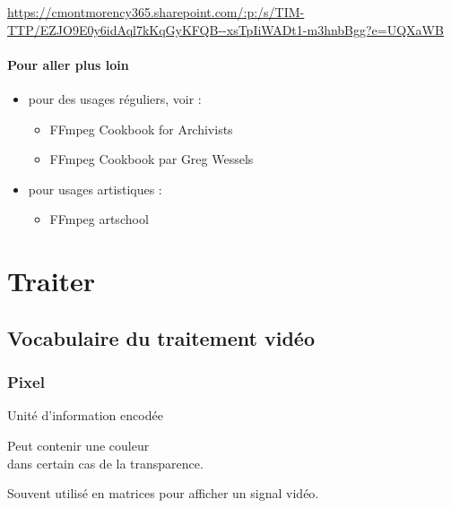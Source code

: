 \documentclass[
  french,
]{book}
\providecommand{\tightlist}{%
  \setlength{\itemsep}{0pt}\setlength{\parskip}{0pt}}
\begin{document}
\url{https://cmontmorency365.sharepoint.com/:p:/s/TIM-TTP/EZJO9E0y6idAql7kKqGyKFQB--xsTpIiWADt1-m3hnbBgg?e=UQXaWB}

\hypertarget{pour-aller-plus-loin}{%
\subsubsection{Pour aller plus loin}\label{pour-aller-plus-loin}}

\begin{itemize}
\item
  pour des usages réguliers, voir :

  \begin{itemize}
  \tightlist
  \item
    FFmpeg Cookbook for Archivists \citep{kromer_FFmpegCookbookArchivists_2020}
  \item
    FFmpeg Cookbook par Greg Wessels \citep{wessels_FFmpegCookbook_2017}
  \end{itemize}
\item
  pour usages artistiques :

  \begin{itemize}
  \tightlist
  \item
    FFmpeg artschool \citep{associationofmovingimagearchivists_FFmpegArtschool_2020}
  \end{itemize}
\end{itemize}

\hypertarget{traiter}{%
\chapter{Traiter}\label{traiter}}

\hypertarget{vocabulaire-du-traitement-viduxe9o}{%
\section{Vocabulaire du traitement vidéo}\label{vocabulaire-du-traitement-viduxe9o}}

\hypertarget{pixel}{%
\subsection{Pixel}\label{pixel}}

Unité d'information encodée

Peut contenir une couleur\\
dans certain cas de la transparence.

Souvent utilisé en matrices pour afficher un signal vidéo.
\end{document}
